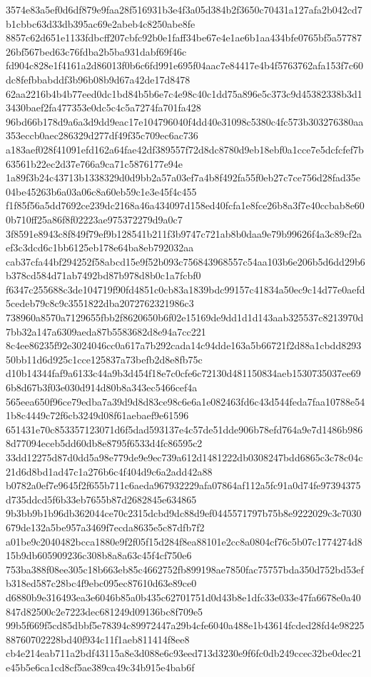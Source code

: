 \documentclass[11pt,a4paper]{article}
\begin{document}
{3574e83a5ef0d6df879e9faa28f516931b3e4f3a05d384b2f3650c70431a127afa2b042cd7b1cbbc63d33db395ac69e2abeb4c8250abe8fe
8857c62d651e1133fdbcff207cbfc92b0e1faff34be67e4e1ae6b1aa434bfe0765bf5a5778726bf567bed63c76fdba2b5ba931dabf69f46c
fd904c828e1f4161a2d86013f0b6c6fd991e695f04aac7e84417e4b4f5763762afa153f7c60dc8fefbbabddf3b96b08b9d67a42de17d8478
62aa2216b4b4b77eed0dc1bd84b5b6e7c4e98c40c1dd75a896e5c373c9d45382338b3d13430baef2fa477353e0dc5c4c5a7274fa701fa428
96bd66b178d9a6a3d9dd9eac17e104796040f4dd40e31098c5380c4fc573b303276380aa353eccb0aec286329d277df49f35c709ec6ac736
a183aef028f41091efd162a64fae42df389557f72d8dc8780d9eb18ebf0a1cce7e5dcfcfef7b63561b22ec2d37e766a9ca71c5876177e94e
1a89f3b24c43713b1338329d0d9bb2a57a03ef7a4b8f492fa55f0eb27c7ce756d28fad35e04be45263b6a03a06c8a60eb59c1e3e45f4c455
f1f85f56a5dd7692ce239dc2168a46a434097d158ed40fcfa1e8fce26b8a3f7e40ccbab8e600b710ff25a86f8f02223ae975372279d9a0c7
3f8591e8943c8f849f79ef9b128541b211f3b9747c721ab8b0daa9e79b99626f4a3c89cf2aef3c3dcd6c1bb6125eb178e64ba8eb792032aa
cab37cfa44bf294252f58abcd15e9f52b093c756843968557c54aa103b6e206b5d6dd29b6b378cd584d71ab7492bd87b978d8b0c1a7fcbf0
f6347c255688c3de104719f90fd4851c0cb83a1839bdc99157c41834a50ec9c14d77e0aefd5cedeb79c8c9c3551822dba2072762321986c3
738960a8570a7129655fbb2f8620650b6f02e15169de9dd1d1d143aab325537c8213970d7bb32a147a6309aeda87b5583682d8e94a7cc221
8c4ee86235f92e3024046cc0a617a7b292cada14c94dde163a5b66721f2d88a1cbdd829350bb11d6d925c1cce125837a73befb2d8e8fb75c
d10b14344faf9a6133c44a9b3d454f18e7c0cfe6c72130d481150834aeb1530735037ee696b8d67b3f03e030d914d80b8a343ec5466cef4a
565eea650f96ce79edba7a39d9d8d83ce98c6e6a1e082463fd6c43d544feda7faa10788e541b8c4449c72f6cb3249d08f61aebaef9e61596
651431e70c853357123071d6f5dad593137e4c57de51dde906b78efd764a9e7d1486b9868d77094eceb5dd60db8e8795f6533d4fc86595c2
33dd12275d87d0dd5a98e779de9e9ec739a612d1481222db0308247bdd6865c3c78c04c21d6d8bd1ad47c1a276b6c4f404d9c6a2add42a88
b0782a0ef7e9645f2f655b711c6aeda967932229afa07864af112a5fc91a0d74fe97394375d735ddcd5f6b33eb7655b87d2682845e634865
9b3bb9b1b96db362044ce70c2315dcbd9dc88d9ef0445571797b75b8e9222029c3c7030679de132a5be957a3469f7ecda8635e5c87dfb7f2
a01be9c2040482bcca1880e9f2f05f15d284f8ea88101e2cc8a0804cf76c5b07c1774274d815b9db605909236c308b8a8a63c45f4cf750e6
753ba388f08ee305c18b663eb85c4662752fb899198ae7850fac75757bda350d752bd53efb318ed587c28bc4f9ebc095ec87610d63e89ce0
d6880b9e316493ea3e6046b85a0b435c62701751d0d43b8e1dfc33e033e47fa6678e0a40847d82500c2e7223dec681249d09136bc8f709e5
99b5f669f5cd85dbbf5e78394c89972447a29b4cfe6040a488e1b43614fcded28fd4e9822588760702228bd40f934c11f1aeb811414f8ee8
cb4e214eab711a2bdf43115a8e3d088e6c93eed713d3230e9f6fc0db249ccec32be0dec21e45b5e6ca1cd8cf5ae389ca49c34b915e4bab6f
}
\end{document}
